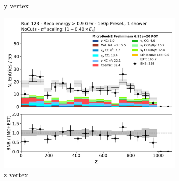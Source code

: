 \begin{figure}[H]
\begin{subfigure}{0.3\textwidth}
    \caption{y vertex}
    \end{subfigure}
    \begin{subfigure}{0.3\textwidth}
    \includegraphics[width=1.0\textwidth]{1e0p/High_E_Sideband/reco_nu_vtx_z.pdf}
    \caption{z vertex}
    \end{subfigure}
    \caption{} 
    \label{fig:HE_1eNp_1}
\end{figure}

